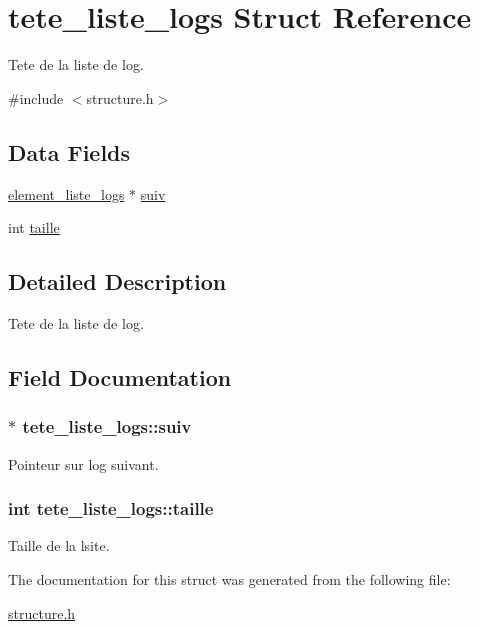 \hypertarget{structtete__liste__logs}{}\section{tete\+\_\+liste\+\_\+logs Struct Reference}
\label{structtete__liste__logs}


Tete de la liste de log.  




{\ttfamily \#include $<$structure.\+h$>$}

\subsection*{Data Fields}
\begin{DoxyCompactItemize}
\item 
\hyperlink{structelement__liste__logs}{element\+\_\+liste\+\_\+logs} $\ast$ \hyperlink{structtete__liste__logs_ae72cf473c10ac41a8f213a7eba62d9ab}{suiv}
\item 
int \hyperlink{structtete__liste__logs_a914da8dc81793af4d65c7007699e1ac0}{taille}
\end{DoxyCompactItemize}


\subsection{Detailed Description}
Tete de la liste de log. 

\subsection{Field Documentation}
\subsubsection[{\texorpdfstring{suiv}{suiv}}]{$\ast$ tete\+\_\+liste\+\_\+logs\+::suiv}\hypertarget{structtete__liste__logs_ae72cf473c10ac41a8f213a7eba62d9ab}{}\label{structtete__liste__logs_ae72cf473c10ac41a8f213a7eba62d9ab}
Pointeur sur log suivant. 
\subsubsection[{\texorpdfstring{taille}{taille}}]{\setlength{\rightskip}{0pt plus 5cm}int tete\+\_\+liste\+\_\+logs\+::taille}\hypertarget{structtete__liste__logs_a914da8dc81793af4d65c7007699e1ac0}{}\label{structtete__liste__logs_a914da8dc81793af4d65c7007699e1ac0}
Taille de la lsite. 

The documentation for this struct was generated from the following file\+:\begin{DoxyCompactItemize}
\item 
\hyperlink{structure_8h}{structure.\+h}\end{DoxyCompactItemize}
